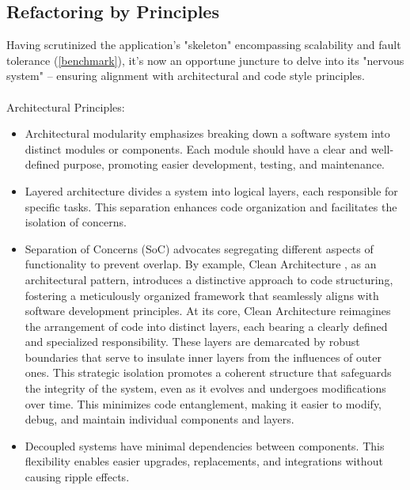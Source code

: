 
\subsection{Refactoring by Principles}

Having scrutinized the application's "skeleton" encompassing scalability and fault tolerance (\ref{benchmark}), it's 
now an opportune juncture to delve into its "nervous system" -- ensuring alignment with architectural and code style 
principles.\\
\\

\noindent Architectural Principles:

\begin{itemize}
  \item Architectural modularity \cite{Rich20} emphasizes breaking down a software system into distinct modules or 
  components. Each module should have a clear and well-defined purpose, promoting easier development, testing, and 
  maintenance.

  \item Layered architecture \cite{Rich22} divides a system into logical layers, each responsible for specific tasks. 
  This separation enhances code organization and facilitates the isolation of concerns.

  \item Separation of Concerns (SoC) advocates segregating different aspects of functionality to prevent overlap. By 
  example, Clean Architecture \cite{Mart18}, as an architectural pattern, introduces a distinctive approach to code 
  structuring, fostering a meticulously organized framework that seamlessly aligns with software development principles. 
  At its core, Clean Architecture reimagines the arrangement of code into distinct layers, each bearing a clearly 
  defined and specialized responsibility. These layers are demarcated by robust boundaries that serve to insulate 
  inner layers from the influences of outer ones. This strategic isolation promotes a coherent structure that safeguards 
  the integrity of the system, even as it evolves and undergoes modifications over time. This minimizes code 
  entanglement, making it easier to modify, debug, and maintain individual components and layers.

  \item Decoupled systems \cite{Kass05} have minimal dependencies between components. This flexibility enables easier 
  upgrades, replacements, and integrations without causing ripple effects.
\end{itemize}

